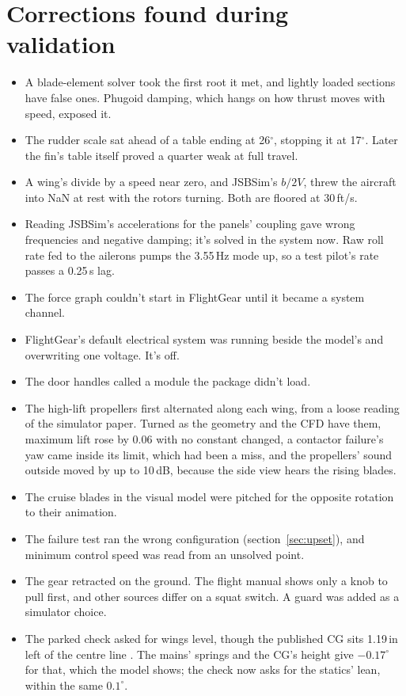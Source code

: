 \documentclass[10pt,a4paper,twocolumn]{article}
\begin{document}
\section{Corrections found during validation}\label{sec:review}
\begin{itemize}
\item A blade-element solver took the first root it met, and lightly loaded sections have false ones. Phugoid damping, which hangs on how thrust moves with speed, exposed it.
\item The rudder scale sat ahead of a table ending at 26$^\circ$, stopping it at 17$^\circ$. Later the fin's table itself proved a quarter weak at full travel.
\item A wing's divide by a speed near zero, and JSBSim's $b/2V$, threw the aircraft into NaN at rest with the rotors turning. Both are floored at 30\,ft/s.
\item Reading JSBSim's accelerations for the panels' coupling gave wrong frequencies and negative damping; it's solved in the system now. Raw roll rate fed to the ailerons pumps the 3.55\,Hz mode up, so a test pilot's rate passes a 0.25\,s lag.
\item The force graph couldn't start in FlightGear until it became a system channel.
\item FlightGear's default electrical system was running beside the model's and overwriting one voltage. It's off.
\item The door handles called a module the package didn't load.
\item The high-lift propellers first alternated along each wing, from a loose reading of the simulator paper. Turned as the geometry and the CFD have them, maximum lift rose by 0.06 with no constant changed, a contactor failure's yaw came inside its limit, which had been a miss, and the propellers' sound outside moved by up to 10\,dB, because the side view hears the rising blades.
\item The cruise blades in the visual model were pitched for the opposite rotation to their animation.
\item The failure test ran the wrong configuration (section~\ref{sec:upset}), and minimum control speed was read from an unsolved point.
\item The gear retracted on the ground. The flight manual shows only a knob to pull first, and other sources differ on a squat switch. A guard was added as a simulator choice.
\item The parked check asked for wings level, though the published CG sits 1.19\,in left of the centre line \cite{sim3}. The mains' springs and the CG's height give $-0.17^\circ$ for that, which the model shows; the check now asks for the statics' lean, within the same $0.1^\circ$.

\end{itemize}
\end{document}
